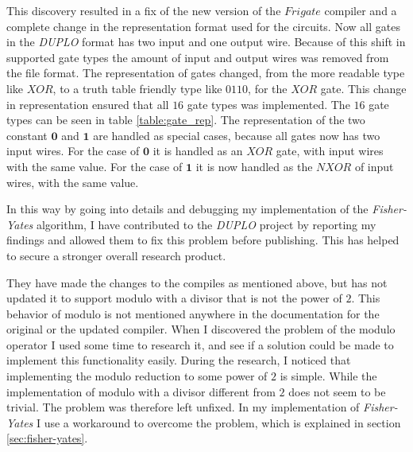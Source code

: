 \documentclass[twoside,11pt,openright]{report}
\newcommand{\FY}{\textit{Fisher-Yates} }
\newcommand{\DUPLO}{\textit{DUPLO} }
\begin{document}
\bigskip

\begin{table}
\centering
{}
\caption{A table of the 16 different gate types, that can be used in a circuit of the type used in \DUPLO}
\label{table:gate_rep}
\end{table}


This discovery resulted in a fix of the new version of the $Frigate$ compiler and a complete change in the representation format used for the circuits. Now all gates in the \DUPLO format has two input and one output wire. Because of this shift in supported gate types the amount of input and output wires was removed from the file format. The representation of gates changed, from the more readable type like $XOR$, to a truth table friendly type like $0110$, for the $XOR$ gate. This change in representation ensured that all $16$ gate types was implemented. The $16$ gate types can be seen in table \ref{table:gate_rep}. The representation of the two constant $\textbf{0}$ and $\textbf{1}$ are handled as special cases, because all gates now has two input wires. For the case of $\textbf{0}$ it is handled as an $XOR$ gate, with input wires with the same value. For the case of $\textbf{1}$ it is now handled as the $NXOR$ of input wires, with the same value.

In this way by going into details and debugging my implementation of the \FY algorithm, I have contributed to the \DUPLO project by reporting my findings and allowed them to fix this problem before publishing. This has helped to secure a stronger overall research product.

They have made the changes to the compiles as mentioned above, but has not updated it to support modulo with a divisor that is not the power of $2$. This behavior of modulo is not mentioned anywhere in the documentation for the original or the updated compiler. When I discovered the problem of the modulo operator I used some time to research it, and see if a solution could be made to implement this functionality easily. During the research, I noticed that implementing the modulo reduction to some power of $2$ is simple. While the implementation of modulo with a divisor different from $2$ does not seem to be trivial. The problem was therefore left unfixed. In my implementation of \FY I use a workaround to overcome the problem, which is explained in section \ref{sec:fisher-yates}.
\end{document}
